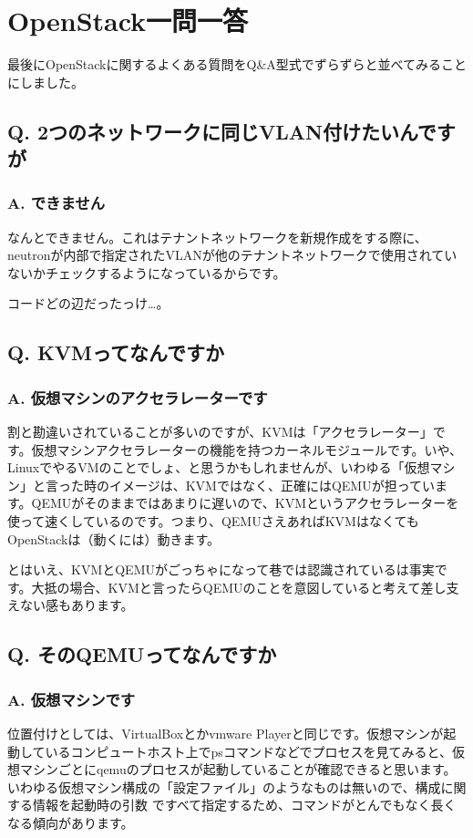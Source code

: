 \documentclass[9pt,b5paper,tombo,openany]{jsbook}
\begin{document}
\chapter{OpenStack一問一答}

最後にOpenStackに関するよくある質問をQ\&A型式でずらずらと並べてみることにしました。

\section*{Q. 2つのネットワークに同じVLAN付けたいんですが}
\subsection*{A. できません}
なんとできません。これはテナントネットワークを新規作成をする際に、neutronが内部で指定されたVLANが他のテナントネットワークで使用されていないかチェックするようになっているからです。

コードどの辺だったっけ…。

\section*{Q. KVMってなんですか}
\subsection*{A. 仮想マシンのアクセラレーターです}
割と勘違いされていることが多いのですが、KVMは「アクセラレーター」です。仮想マシンアクセラレーターの機能を持つカーネルモジュールです。いや、LinuxでやるVMのことでしょ、と思うかもしれませんが、いわゆる「仮想マシン」と言った時のイメージは、KVMではなく、正確にはQEMUが担っています。QEMUがそのままではあまりに遅いので、KVMというアクセラレーターを使って速くしているのです。つまり、QEMUさえあればKVMはなくてもOpenStackは（動くには）動きます。

とはいえ、KVMとQEMUがごっちゃになって巷では認識されているは事実です。大抵の場合、KVMと言ったらQEMUのことを意図していると考えて差し支えない感もあります。

\section*{Q. そのQEMUってなんですか}
\subsection*{A. 仮想マシンです}
位置付けとしては、VirtualBoxとかvmware Playerと同じです。仮想マシンが起動しているコンピュートホスト上でpsコマンドなどでプロセスを見てみると、仮想マシンごとにqemuのプロセスが起動していることが確認できると思います。いわゆる仮想マシン構成の「設定ファイル」のようなものは無いので、構成に関する情報を起動時の引数
ですべて指定するため、コマンドがとんでもなく長くなる傾向があります。
\end{document}
